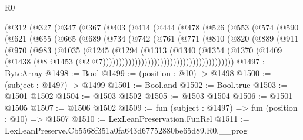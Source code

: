 \begin{lexlean}{R0}
\begin{coremodule}
            (@312
              (@327
                (@347
                  (@367
                    (@403
                      (@414
                        (@444
                          (@478
                            (@526
                              (@553
                                (@574
                                  (@590
                                    (@621
                                      (@655
                                        (@665
                                          (@689
                                            (@734
                                              (@742
                                                (@761
                                                  (@771
                                                    (@810
                                                      (@820
                                                        (@889
                                                          (@911
                                                            (@970
                                                              (@983
                                                                (@1035
                                                                  (@1245
                                                                    (@1294
                                                                      (@1313
                                                                        (@1340
                                                                          (@1354
                                                                            (@1370
                                                                              (@1409
                                                                                (@1438
                                                                                  (@8
                                                                                    @1453
                                                                                    (@2
                                                                                      @7)))))))))))))))))))))))))))))))))))))))))
@1497 := ByteArray
@1498 := Bool
@1499 := (position : @10) -> @1498
@1500 := (subject : @1497) -> @1499
@1501 := Bool.and
@1502 := Bool.true
@1503 := @1501 @1502
@1504 := @1503 @1502
@1505 := @1503 @1504
@1506 := @1501 @1505
@1507 := @1506 @1502
@1509 := fun (subject : @1497) => fun (position : @10) => @1507
@1510 := LexLeanPreservation.FunRel
@1511 := LexLeanPreserve.Cb5568f351a0fa643d67752880be65d89.R0.__prog

\end{coremodule}
\end{lexlean}
